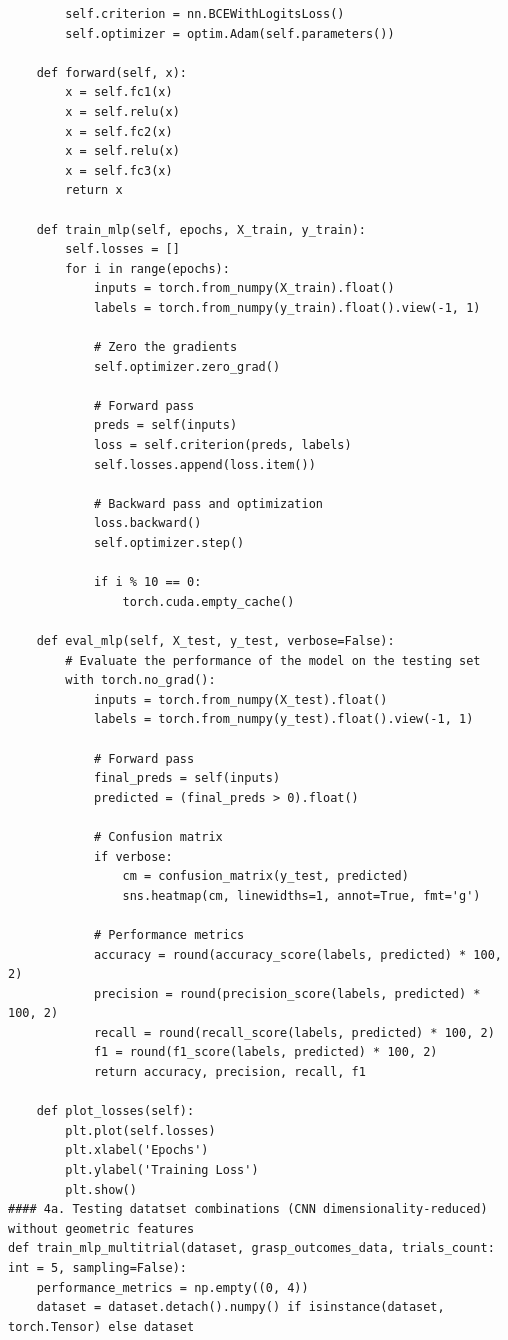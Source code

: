 \documentclass[11pt, a4paper]{report}
\begin{document}
\begin{lstlisting}
        self.criterion = nn.BCEWithLogitsLoss()
        self.optimizer = optim.Adam(self.parameters())

    def forward(self, x):
        x = self.fc1(x)
        x = self.relu(x)
        x = self.fc2(x)
        x = self.relu(x)
        x = self.fc3(x)
        return x
        
    def train_mlp(self, epochs, X_train, y_train):
        self.losses = []
        for i in range(epochs):
            inputs = torch.from_numpy(X_train).float()
            labels = torch.from_numpy(y_train).float().view(-1, 1)

            # Zero the gradients
            self.optimizer.zero_grad()

            # Forward pass
            preds = self(inputs)
            loss = self.criterion(preds, labels)
            self.losses.append(loss.item())

            # Backward pass and optimization
            loss.backward()
            self.optimizer.step()

            if i % 10 == 0:
                torch.cuda.empty_cache()

    def eval_mlp(self, X_test, y_test, verbose=False):
        # Evaluate the performance of the model on the testing set
        with torch.no_grad():
            inputs = torch.from_numpy(X_test).float()
            labels = torch.from_numpy(y_test).float().view(-1, 1)

            # Forward pass
            final_preds = self(inputs)
            predicted = (final_preds > 0).float()
            
            # Confusion matrix
            if verbose:
                cm = confusion_matrix(y_test, predicted)
                sns.heatmap(cm, linewidths=1, annot=True, fmt='g')

            # Performance metrics
            accuracy = round(accuracy_score(labels, predicted) * 100, 2)
            precision = round(precision_score(labels, predicted) * 100, 2)
            recall = round(recall_score(labels, predicted) * 100, 2)
            f1 = round(f1_score(labels, predicted) * 100, 2)
            return accuracy, precision, recall, f1
    
    def plot_losses(self):
        plt.plot(self.losses)
        plt.xlabel('Epochs')
        plt.ylabel('Training Loss')
        plt.show()
#### 4a. Testing datatset combinations (CNN dimensionality-reduced) without geometric features
def train_mlp_multitrial(dataset, grasp_outcomes_data, trials_count: int = 5, sampling=False):
    performance_metrics = np.empty((0, 4))
    dataset = dataset.detach().numpy() if isinstance(dataset, torch.Tensor) else dataset


\end{lstlisting}
\end{document}
